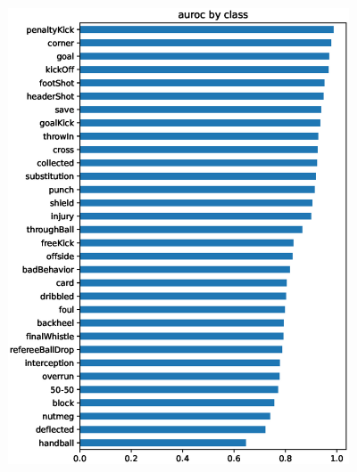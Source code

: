 \begin{figure}
\begin{subfigure}{.24\textwidth}
        \includegraphics[width=0.99\textwidth, keepaspectratio, interpolate]{img/07_auroc_by_class_test_202012-2218-2842.eps}
    \end{subfigure}
    \begin{subfigure}{.24\textwidth}
        \centering

\end{subfigure}
\end{figure}
